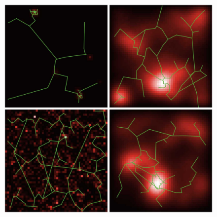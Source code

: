 \begin{figure}
\includegraphics[width=\linewidth]{Figures/Final/5-3-2-fig-correlatedsyntheticdata-exampl}

\end{figure}
